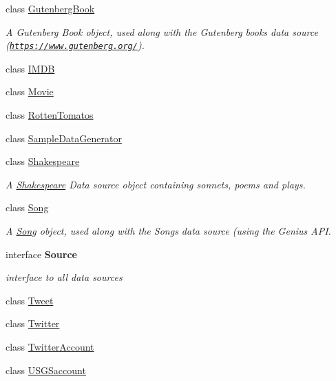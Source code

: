 \begin{DoxyCompactItemize}
class \mbox{\hyperlink{classbridges_1_1data__src__dependent_1_1_gutenberg_book}{Gutenberg\+Book}}
\begin{DoxyCompactList}\small\item\em A Gutenberg Book object, used along with the Gutenberg books data source (\href{https://www.gutenberg.org/}{\tt https\+://www.\+gutenberg.\+org/}). \end{DoxyCompactList}\item 
class \mbox{\hyperlink{classbridges_1_1data__src__dependent_1_1_i_m_d_b}{I\+M\+DB}}
\item 
class \mbox{\hyperlink{classbridges_1_1data__src__dependent_1_1_movie}{Movie}}
\item 
class \mbox{\hyperlink{classbridges_1_1data__src__dependent_1_1_rotten_tomatos}{Rotten\+Tomatos}}
\item 
class \mbox{\hyperlink{classbridges_1_1data__src__dependent_1_1_sample_data_generator}{Sample\+Data\+Generator}}
\item 
class \mbox{\hyperlink{classbridges_1_1data__src__dependent_1_1_shakespeare}{Shakespeare}}
\begin{DoxyCompactList}\small\item\em A \mbox{\hyperlink{classbridges_1_1data__src__dependent_1_1_shakespeare}{Shakespeare}} Data source object containing sonnets, poems and plays. \end{DoxyCompactList}\item 
class \mbox{\hyperlink{classbridges_1_1data__src__dependent_1_1_song}{Song}}
\begin{DoxyCompactList}\small\item\em A \mbox{\hyperlink{classbridges_1_1data__src__dependent_1_1_song}{Song}} object, used along with the Songs data source (using the Genius A\+PI. \end{DoxyCompactList}\item 
interface {\bfseries Source}
\begin{DoxyCompactList}\small\item\em interface to all data sources \end{DoxyCompactList}\item 
class \mbox{\hyperlink{classbridges_1_1data__src__dependent_1_1_tweet}{Tweet}}
\item 
class \mbox{\hyperlink{classbridges_1_1data__src__dependent_1_1_twitter}{Twitter}}
\item 
class \mbox{\hyperlink{classbridges_1_1data__src__dependent_1_1_twitter_account}{Twitter\+Account}}
\item 
class \mbox{\hyperlink{classbridges_1_1data__src__dependent_1_1_u_s_g_saccount}{U\+S\+G\+Saccount}}
\end{DoxyCompactItemize}
